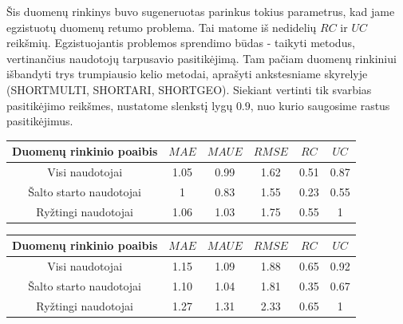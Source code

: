 \documentclass{VUMIFInfMagistrinis}
\begin{document}
\newline
\indent
Šis duomenų rinkinys buvo sugeneruotas parinkus tokius parametrus, kad jame egzistuotų duomenų retumo problema. Tai matome iš nedidelių $RC$ ir $UC$ reikšmių. Egzistuojantis problemos sprendimo būdas - taikyti metodus, vertinančius naudotojų tarpusavio pasitikėjimą. Tam pačiam duomenų rinkiniui išbandyti trys trumpiausio kelio metodai, aprašyti ankstesniame skyrelyje (SHORTMULTI, SHORTARI, SHORTGEO). Siekiant vertinti tik svarbias pasitikėjimo reikšmes, nustatome slenkstį lygų $0.9$, nuo kurio saugosime rastus pasitikėjimus.
\begin{center}
	\begin{tabular}{||c c c c c c||} 
		Duomenų rinkinio poaibis & $MAE$ & $MAUE$ & $RMSE$ & $RC$ & $UC$ \\
		\hline
		Visi naudotojai & 1.05 & 0.99 & 1.62 & 0.51 & 0.87 \\
		\hline
		Šalto starto naudotojai & 1 & 0.83 & 1.55 & 0.23 & 0.55 \\
		\hline
		Ryžtingi naudotojai & 1.06 & 1.03 & 1.75 & 0.55 & 1 \\
	\end{tabular}
\end{center}

\begin{center}
	\begin{tabular}{||c c c c c c||} 
		Duomenų rinkinio poaibis & $MAE$ & $MAUE$ & $RMSE$ & $RC$ & $UC$ \\
		\hline
		Visi naudotojai & 1.15 & 1.09 & 1.88 & 0.65 & 0.92 \\
		\hline
		Šalto starto naudotojai & 1.10 & 1.04 & 1.81 & 0.35 & 0.67 \\
		\hline
		Ryžtingi naudotojai & 1.27 & 1.31 & 2.33 & 0.65 & 1 \\
	\end{tabular}
	
\end{center}
\end{document}
